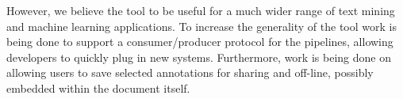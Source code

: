 \documentclass[runningheads,a4paper]{llncs}
\begin{document}
However, we believe the tool to be useful for a much wider range of text mining and machine learning applications.
To increase the generality of the tool work is being done to support a consumer/producer protocol for the pipelines, allowing developers to quickly plug in new systems.
Furthermore, work is being done on allowing users to save selected annotations for sharing and off-line, possibly embedded within the document itself.



\end{document}

